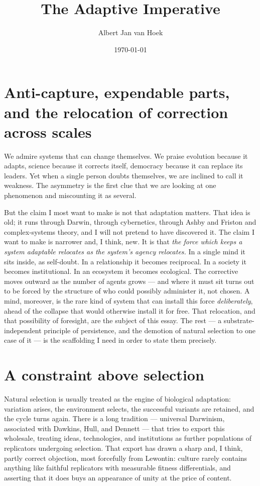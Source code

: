 \documentclass[11pt, a4paper]{report}
\title{The Adaptive Imperative}
\author{Albert Jan van Hoek}
\date{\today}
\begin{document}
\maketitle

\section*{Anti-capture, expendable parts, and the relocation of correction across scales}

We admire systems that can change themselves. We praise evolution because it adapts, science because it corrects itself, democracy because it can replace its leaders. Yet when a single person doubts themselves, we are inclined to call it weakness. The asymmetry is the first clue that we are looking at one phenomenon and miscounting it as several.

But the claim I most want to make is not that adaptation matters. That idea is old; it runs through Darwin, through cybernetics, through Ashby and Friston and complex-systems theory, and I will not pretend to have discovered it. The claim I want to make is narrower and, I think, new. It is that \textit{the force which keeps a system adaptable relocates as the system's agency relocates.} In a single mind it sits inside, as self-doubt. In a relationship it becomes reciprocal. In a society it becomes institutional. In an ecosystem it becomes ecological. The corrective moves outward as the number of agents grows --- and where it must sit turns out to be forced by the structure of who could possibly administer it, not chosen. A mind, moreover, is the rare kind of system that can install this force \textit{deliberately}, ahead of the collapse that would otherwise install it for free. That relocation, and that possibility of foresight, are the subject of this essay. The rest --- a substrate-independent principle of persistence, and the demotion of natural selection to one case of it --- is the scaffolding I need in order to state them precisely.

\section{A constraint above selection}

Natural selection is usually treated as the engine of biological adaptation: variation arises, the environment selects, the successful variants are retained, and the cycle turns again. There is a long tradition --- universal Darwinism, associated with Dawkins, Hull, and Dennett --- that tries to export this wholesale, treating ideas, technologies, and institutions as further populations of replicators undergoing selection. That export has drawn a sharp and, I think, partly correct objection, most forcefully from Lewontin: culture rarely contains anything like faithful replicators with measurable fitness differentials, and asserting that it does buys an appearance of unity at the price of content.
\end{document}
